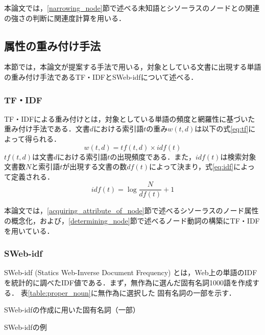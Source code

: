 \documentclass[japanese]{jnlp_1.4}
\begin{document}
本論文では，\ref{narrowing_node}節で述べる未知語とシソーラスのノードとの関連の強さの判断に関連度計算を用いる．


\subsection{属性の重み付け手法}\label{weighted_attribute}

本節では，本論文が提案する手法で用いる，対象としている文書に出現する単語の重み付け手法であるTF・IDF\cite{tokunaga:99}とSWeb-idf\cite{tuji:04}について述べる．

\subsubsection{TF・IDF}\label{tf_idf}

TF・IDFによる重み付けとは，対象としている単語の頻度と網羅性に基づいた重み付け手法である．文書$d$における索引語$t$の重み$w(t,d)$は以下の式\ref{eq:tf}によって得られる．
\begin{equation}
 w(t,d)=tf(t,d){\times}idf(t)
	\label{eq:tf}
\end{equation}
$\mathit{tf}(t,d)$は文書$d$における索引語$t$の出現頻度である．また，$\mathit{idf}(t)$は検索対象文書数$N$と索引語$t$が出現する文書の数$\mathit{df}(t)$によって決まり，式\ref{eq:idf}によって定義される．
\begin{equation}
 idf(t)=\log\frac{N}{df(t)}+1
	\label{eq:idf}
\end{equation}

本論文では，\ref{acquiring_attribute_of_node}節で述べるシソーラスのノード属性の概念化，および，\ref{determining_node}節で述べるノード動詞の構築にTF・IDFを用いている．

\subsubsection{SWeb-idf}\label{SWeb-idf}

SWeb-idf (Statics Web-Inverse Document Frequency) とは，Web上の単語のIDFを統計的に調べたIDF値である．まず，無作為に選んだ固有名詞1000語を作成する．
表\ref{table:proper_noun}に無作為に選択した
固有名詞の一部を示す．


\begin{table}[t]
\begin{minipage}[t]{200pt}
\caption{SWeb-idfの作成に用いた固有名詞（一部）}

\label{table:proper_noun}
\end{minipage}
\hfill
\begin{minipage}[t]{200pt}
\caption{SWeb-idfの例}

\label{table:SWeb-idf}
\end{minipage}
\end{table}
\end{document}
